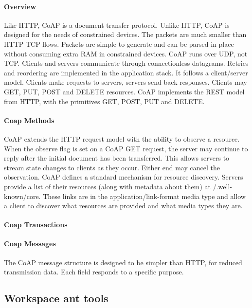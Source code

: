 \paragraph{Overview}
Like HTTP,
	CoAP is a document transfer protocol.
Unlike HTTP,
	CoAP is designed for the needs of constrained devices.
The packets are much smaller than HTTP TCP flows.
Packets are simple to generate and can be parsed in place without consuming extra RAM in constrained devices.
CoAP runs over UDP,
	not TCP.
Clients and servers communicate through connectionless datagrams.
Retries and reordering are implemented in the application stack.
It follows a client/server model.
Clients make requests to servers,
	servers send back responses.
Clients may GET,
	PUT,
	POST and DELETE resources.
CoAP implements the REST model from HTTP,
	with the primitives GET,
	POST,
	PUT and DELETE.

\paragraph{Coap Methods}
CoAP extends the HTTP request model with the ability to observe a resource.
When the observe flag is set on a CoAP GET request,
	the server may continue to reply after the initial document has been transferred. This allows servers to stream state
	changes to clients as they occur. Either end may cancel the observation.
	CoAP defines a standard mechanism for resource discovery. Servers provide a list
	of their resources (along with metadata about them) at /.well-known/core. These links
	are in the application/link-format media type and allow a client to discover what
	resources are provided and what media types they are.

\paragraph{Coap Transactions}

\paragraph{Coap Messages}
The CoAP message structure is designed to be simpler than HTTP,
	for reduced transmission data.
Each field responds to a specific purpose.


\subsection{Workspace ant tools}




































